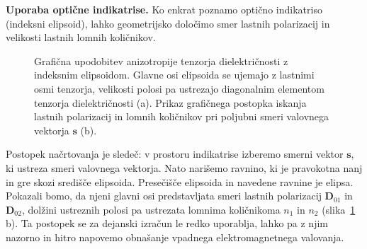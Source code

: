\begin{example}{\bf Uporaba optične indikatrise.} 
\label{chap:ind2}
Ko enkrat poznamo optično indikatriso (indeksni elipsoid), lahko 
geometrijsko določimo smer lastnih polarizacij in velikosti lastnih 
lomnih količnikov.
\begin{figure}[h]
\centering
\def\svgwidth{120truemm} 

\caption{Grafična upodobitev anizotropije tenzorja dielektričnosti z indeksnim
elipsoidom. Glavne osi elipsoida se ujemajo z lastnimi osmi tenzorja, velikosti
polosi pa ustrezajo diagonalnim elementom tenzorja dielektričnosti (a). Prikaz grafičnega
postopka iskanja lastnih polarizacij in lomnih količnikov pri poljubni smeri valovnega
vektorja $\mathbf{s}$ (b).}
\label{fig:10_indikatrisa}
\end{figure}
Postopek načrtovanja je sledeč: v prostoru indikatrise izberemo smerni 
vektor $\mathbf{s}$, ki ustreza smeri valovnega vektorja. Nato 
narišemo ravnino, ki je pravokotna nanj in gre skozi središče elipsoida. 
Presečišče elipsoida in navedene ravnine je elipsa. Pokazali bomo, da njeni 
glavni osi predstavljata smeri lastnih polarizacij $\mathbf{D}_{01}$ in 
$\mathbf{D}_{02}$, dolžini ustreznih polosi pa ustrezata lomnima količnikoma 
$n_1$ in $n_2$ (slika~\ref{fig:10_indikatrisa}\,b). Ta postopek se za dejanski 
izračun le redko uporablja, lahko pa z njim  
nazorno in hitro napovemo obnašanje vpadnega elektromagnetnega valovanja. 


\end{example}
